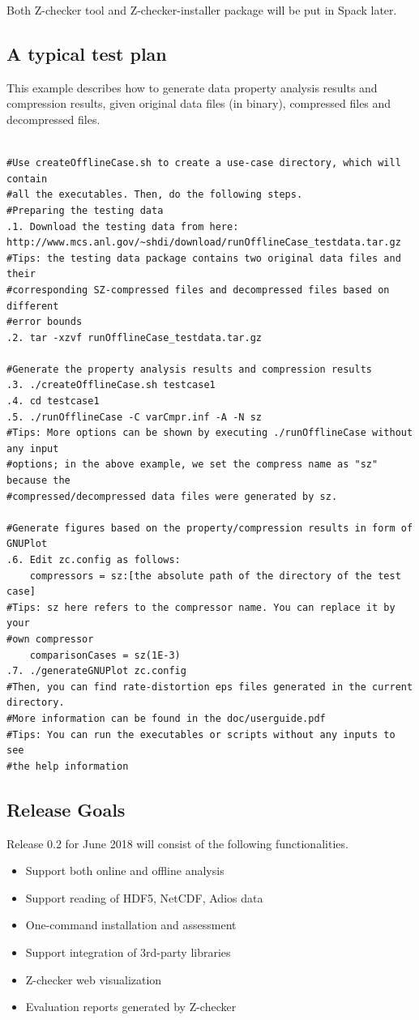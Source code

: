 Both Z-checker tool and Z-checker-installer package will be put in Spack later.

\subsection{A typical test plan}

This example describes how to generate data property analysis results and compression results, given original data files (in binary), compressed files and decompressed files.

\begin{lstlisting}[style=ShellStyleInline, basicstyle =\footnotesize\ttfamily]

#Use createOfflineCase.sh to create a use-case directory, which will contain
#all the executables. Then, do the following steps.
#Preparing the testing data
.1. Download the testing data from here:
http://www.mcs.anl.gov/~shdi/download/runOfflineCase_testdata.tar.gz
#Tips: the testing data package contains two original data files and their
#corresponding SZ-compressed files and decompressed files based on different
#error bounds
.2. tar -xzvf runOfflineCase_testdata.tar.gz

#Generate the property analysis results and compression results
.3. ./createOfflineCase.sh testcase1
.4. cd testcase1
.5. ./runOfflineCase -C varCmpr.inf -A -N sz
#Tips: More options can be shown by executing ./runOfflineCase without any input
#options; in the above example, we set the compress name as "sz" because the
#compressed/decompressed data files were generated by sz.

#Generate figures based on the property/compression results in form of GNUPlot
.6. Edit zc.config as follows:
    compressors = sz:[the absolute path of the directory of the test case]
#Tips: sz here refers to the compressor name. You can replace it by your
#own compressor
    comparisonCases = sz(1E-3)
.7. ./generateGNUPlot zc.config
#Then, you can find rate-distortion eps files generated in the current directory.
#More information can be found in the doc/userguide.pdf
#Tips: You can run the executables or scripts without any inputs to see
#the help information
\end{lstlisting}

\subsection{Release Goals}
Release 0.2 for June 2018 will consist of the following functionalities.

\begin{itemize}
  \item Support both online and offline analysis
  \item Support reading of HDF5, NetCDF, Adios data
  \item One-command installation and assessment
  \item Support integration of 3rd-party libraries
  \item Z-checker web visualization
  \item Evaluation reports generated by Z-checker
\end{itemize}
